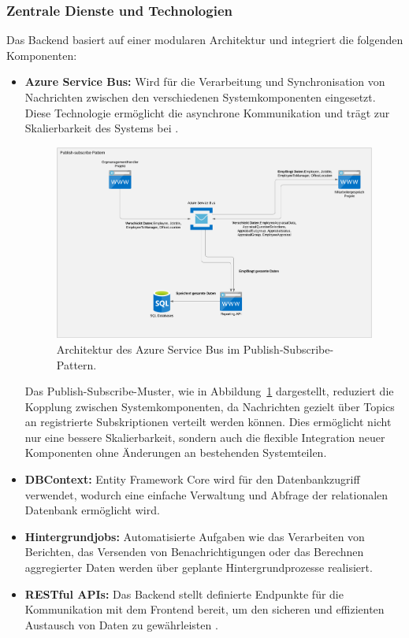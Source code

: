 \subsubsection*{Zentrale Dienste und Technologien}
Das Backend basiert auf einer modularen Architektur und integriert die folgenden Komponenten:
\begin{itemize}
    \item \textbf{Azure Service Bus:} Wird für die Verarbeitung und Synchronisation von Nachrichten zwischen den verschiedenen Systemkomponenten eingesetzt. Diese Technologie ermöglicht die asynchrone Kommunikation und trägt zur Skalierbarkeit des Systems bei \cite{azureServiceBus2024}.

\begin{figure}[H]
    \centering
    \includegraphics[width=1.0\textwidth]{images/Azure (2019) framework - Page 1.png}
    \caption{Architektur des Azure Service Bus im Publish-Subscribe-Pattern.}
    \label{fig:azure_bus_architecture}
\end{figure}

Das Publish-Subscribe-Muster, wie in Abbildung~\ref{fig:azure_bus_architecture} dargestellt, reduziert die Kopplung zwischen Systemkomponenten, da Nachrichten gezielt über Topics an registrierte Subskriptionen verteilt werden können. Dies ermöglicht nicht nur eine bessere Skalierbarkeit, sondern auch die flexible Integration neuer Komponenten ohne Änderungen an bestehenden Systemteilen.


    \item \textbf{DBContext:} Entity Framework Core wird für den Datenbankzugriff verwendet, wodurch eine einfache Verwaltung und Abfrage der relationalen Datenbank ermöglicht wird.\cite{entityFrameworkCore2020}
    \item \textbf{Hintergrundjobs:} Automatisierte Aufgaben wie das Verarbeiten von Berichten, das Versenden von Benachrichtigungen oder das Berechnen aggregierter Daten werden über geplante Hintergrundprozesse realisiert.\cite{backgroundTasks2017}
    \item \textbf{RESTful APIs:} Das Backend stellt definierte Endpunkte für die Kommunikation mit dem Frontend bereit, um den sicheren und effizienten Austausch von Daten zu gewährleisten \cite{microsoftDotNet}.
\end{itemize}

